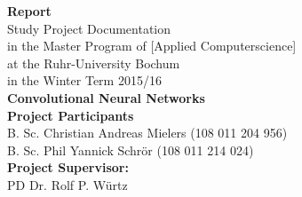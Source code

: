 \documentclass[11pt, a4paper]{article}
\begin{document}
\thispagestyle{empty}

\setlength{\hoffset}{-0.5cm} %

\lstset{
  basicstyle=\small,           %
  breaklines=true,             %
  captionpos=b,                %
  frame=single,                %
  keepspaces=true,             %
  numbers=right,               %
  showspaces=false,            %
  stepnumber=1,                %
  tabsize=4,                   %
  xleftmargin=0.14cm		   %
}


\begin{titlepage}
    \begin{center}
    \vphantom{0cm}
    \LARGE \textbf{Report}\\
    \vspace{3cm}
    \normalsize
    Study Project Documentation \\
    in the Master Program of \textcolor{AI-BLUE}{[Applied Computerscience]}\\
    at the Ruhr-University Bochum\\
    in the Winter Term 2015/16\\
    \vspace{4cm}
    \huge \textbf{Convolutional Neural Networks} \\
    \vspace{4cm}
    \normalsize
    \textbf{Project Participants}\\
    B. Sc. Christian Andreas Mielers (108 011 204 956)\\
    B. Sc. Phil Yannick Schrör (108 011 214 024)\\
    \vspace{2cm}
    \textbf{Project Supervisor:}\\
    PD Dr. Rolf P. Würtz
    \end{center}
\end{titlepage}

\newpage
{}
\setcounter{page}{2}

\tableofcontents
\end{document}
